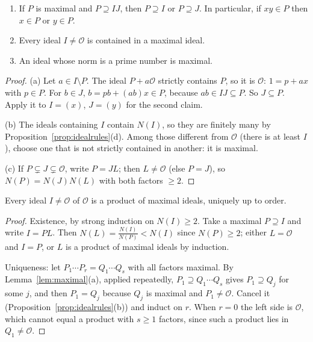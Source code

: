 \begin{lemma}\label{lem:maximal}
\begin{enumerate}[label=(\alph*)]
\item If $P$ is maximal and $P\supseteq IJ$, then $P\supseteq I$ or $P\supseteq J$. In particular, if $xy\in P$ then $x\in P$ or $y\in P$.
\item Every ideal $I\ne\mathcal O$ is contained in a maximal ideal.
\item An ideal whose norm is a prime number is maximal.
\end{enumerate}
\end{lemma}
\begin{proof}
(a) Let $a\in I\setminus P$. The ideal $P+a\mathcal O$ strictly contains $P$, so it is $\mathcal O$: $1=p+ax$ with $p\in P$. For $b\in J$, $b=pb+(ab)x\in P$, because $ab\in IJ\subseteq P$. So $J\subseteq P$. Apply it to $I=(x)$, $J=(y)$ for the second claim.

(b) The ideals containing $I$ contain $N(I)$, so they are finitely many by Proposition~\ref{prop:idealrules}(d). Among those different from $\mathcal O$ (there is at least $I$), choose one that is not strictly contained in another: it is maximal.

(c) If $P\subsetneq J\subsetneq\mathcal O$, write $P=JL$; then $L\ne\mathcal O$ (else $P=J$), so $N(P)=N(J)N(L)$ with both factors $\ge2$.
\end{proof}

\begin{theorem}\label{thm:dedekind}
Every ideal $I\ne\mathcal O$ of $\mathcal O$ is a product of maximal ideals, uniquely up to order.
\end{theorem}
\begin{proof}
Existence, by strong induction on $N(I)\ge2$. Take a maximal $P\supseteq I$ and write $I=PL$. Then $N(L)=\frac{N(I)}{N(P)}<N(I)$ since $N(P)\ge2$; either $L=\mathcal O$ and $I=P$, or $L$ is a product of maximal ideals by induction.

Uniqueness: let $P_1\cdots P_r=Q_1\cdots Q_s$ with all factors maximal. By Lemma~\ref{lem:maximal}(a), applied repeatedly, $P_1\supseteq Q_1\cdots Q_s$ gives $P_1\supseteq Q_j$ for some $j$, and then $P_1=Q_j$ because $Q_j$ is maximal and $P_1\ne\mathcal O$. Cancel it (Proposition~\ref{prop:idealrules}(b)) and induct on $r$. When $r=0$ the left side is $\mathcal O$, which cannot equal a product with $s\ge1$ factors, since such a product lies in $Q_1\ne\mathcal O$.
\end{proof}

